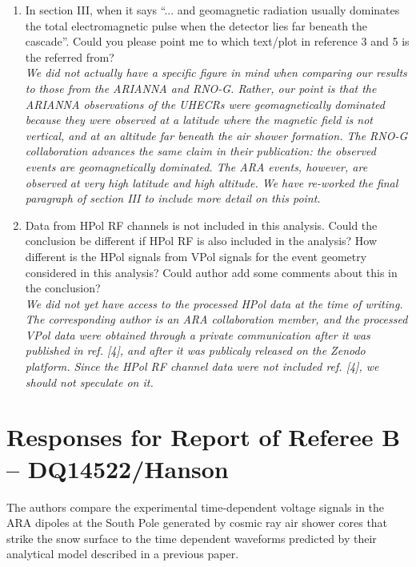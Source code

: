 \documentclass[amsmath,amssymb,aps,prd,10pt,twocolumn,showkeys]{revtex4}
\begin{document}
\begin{enumerate}
\item In section III, when it says ``... and geomagnetic radiation usually dominates the total electromagnetic pulse when the detector lies far beneath the cascade''.  Could you please point me to which text/plot in reference 3 and 5 is the referred from? \\

\textit{We did not actually have a specific figure in mind when comparing our results to those from the ARIANNA and RNO-G.  Rather, our point is that the ARIANNA observations of the UHECRs were geomagnetically dominated because they were observed at a latitude where the magnetic field is not vertical, and at an altitude far beneath the air shower formation.  The RNO-G collaboration advances the same claim in their publication: the observed events are geomagnetically dominated.  The ARA events, however, are observed at very high latitude and high altitude.  We have re-worked the final paragraph of section III to include more detail on this point.}

\item Data from HPol RF channels is not included in this analysis. Could the conclusion be different if HPol RF is also included in the analysis? How different is the HPol signals from VPol signals for the event geometry considered in this analysis? Could author add some comments about this in the conclusion? \\

\textit{We did not yet have access to the processed HPol data at the time of writing.  The corresponding author is an ARA collaboration member, and the processed VPol data were obtained through a private communication after it was published in ref. [4], and after it was publicaly released on the Zenodo platform.  Since the HPol RF channel data were not included ref. [4], we should not speculate on it.}

\end{enumerate}

\section{Responses for Report of Referee B -- DQ14522/Hanson}

The authors compare the experimental time-dependent voltage signals in the ARA dipoles at the South Pole generated by cosmic ray air shower cores that strike the snow surface  to the time dependent waveforms predicted by their analytical model described in a previous paper.
\end{document}
